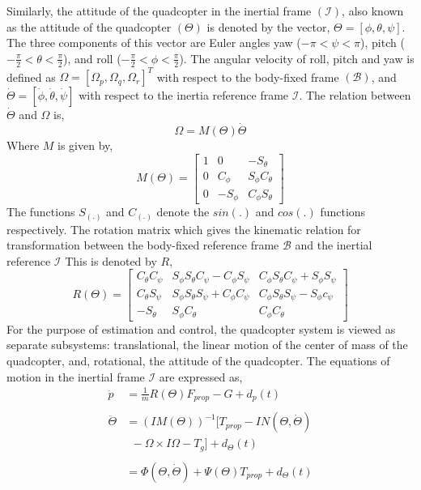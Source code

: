 \documentclass[letterpaper%
, twoside%
, 12pt%
,memoire%
, english%
,creativecommons,hyperref%
]{thETS}
\theoremstyle{newThmStyle}
\begin{document}
Similarly, the attitude of the quadcopter in the inertial frame $(\mathcal{I})$, also known as the attitude of the quadcopter $(\Theta)$ is denoted by the vector, $\Theta=[\phi,\theta,\psi]$. The three components of this vector are Euler angles yaw ($-\pi<\psi<\pi$), pitch ($-\frac{\pi}{2}<\theta<\frac{\pi}{2}$), and roll ($-\frac{\pi}{2}<\phi<\frac{\pi}{2}$). The angular velocity of roll, pitch and yaw is defined as $\Omega=[\Omega_p,\Omega_q,\Omega_r]^T$ with respect to the body-fixed frame $(\mathcal{B})$, and $\dot{\Theta}=[\dot{\phi},\dot{\theta},\dot{\psi}]$ with respect to the inertia reference frame $\mathcal{I}$. The relation between $\dot{\Theta}$ and $\Omega$ is, 
\begin{equation}
\Omega=M(\Theta)\dot{\Theta}
\end{equation}
Where $M$ is given by, 
\begin{equation*}
M(\Theta)=
\left[\begin{array}{ccc}
1 & 0 & -S_{\theta} \\
0 & C_{\phi} & S_{\phi}C_{\theta}  \\
0 & -S_{\phi} & C_{\phi}S_{\theta}
\end{array}\right]
\end{equation*}
The functions $S_{(.)}$ and $C_{(.)}$ denote the $sin(.)$ and $cos(.)$ functions respectively. The rotation matrix which gives the kinematic relation for transformation between the body-fixed reference frame $\mathcal{B}$ and the inertial reference $\mathcal{I}$ This is denoted by $R$,
\begin{equation}
R(\Theta)=
\left[\begin{array}{ccc}
C_{\theta}C_{\psi} & S_{\phi}S_{\theta}C_{\psi}-C_{\phi}S_{\psi} & C_{\phi}S_{\theta}C_{\psi}+S_{\phi}S_{\psi} \\
C_{\theta}S_{\psi} & S_{\phi}S_{\theta}S_{\psi}+C_{\phi}C_{\psi} & C_{\phi}S_{\theta}S_{\psi}-S_{\phi}c_{\psi}  \\
-S_{\theta}  & S_{\phi}C_{\theta}  & C_{\phi}C_{\theta}
\end{array}\right]
\end{equation} 
For the purpose of estimation and control, the quadcopter system is viewed as separate subsystems: translational, the linear motion of the center of mass of the quadcopter, and, rotational, the attitude of the quadcopter. The equations of motion in the inertial frame $\mathcal{I}$ are expressed as,
\begin{subequations} \label{eq:dynamic_basic}
\begin{align} 
\ddot{p} &=\frac{1}{m}R(\Theta)F_{prop}-G+d_{p}(t)\nonumber \\ \label{eq:dynamic_basic_translation} \\
\ddot{\Theta} &=(IM(\Theta))^{-1}[T_{prop}-IN(\Theta,\dot{\Theta}) \nonumber \\
& \ \ -\Omega\times I\Omega-T_g]+d_{\Theta}(t)\nonumber\\ \nonumber \\
&=\Phi(\Theta,\dot{\Theta})+\Psi(\Theta) T_{prop}+d_{\Theta}(t)
 \label{eq:dynamic_basic_rotation}
\end{align}
\end{subequations}
\end{document}
